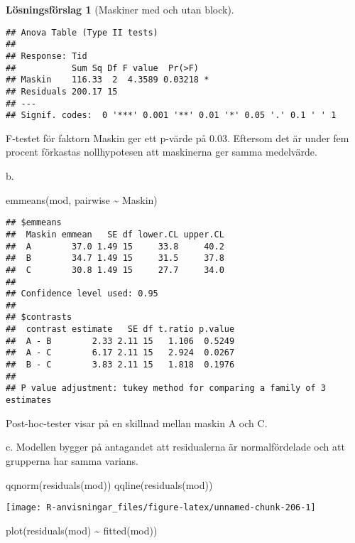 \documentclass[
]{book}
\newenvironment{Shaded}{\begin{snugshade}}{\end{snugshade}}
\newcommand{\FunctionTok}[1]{\textcolor[rgb]{0.00,0.00,0.00}{#1}}
\newcommand{\NormalTok}[1]{#1}
\newcommand{\SpecialCharTok}[1]{\textcolor[rgb]{0.00,0.00,0.00}{#1}}
\theoremstyle{definition}
\theoremstyle{definition}
\theoremstyle{definition}
\theoremstyle{definition}
\newtheorem{hypothesis}{Lösningsförslag}[chapter]
\theoremstyle{remark}
\begin{document}
\begin{hypothesis}[Maskiner med och utan block]
\begin{verbatim}
## Anova Table (Type II tests)
## 
## Response: Tid
##           Sum Sq Df F value  Pr(>F)  
## Maskin    116.33  2  4.3589 0.03218 *
## Residuals 200.17 15                  
## ---
## Signif. codes:  0 '***' 0.001 '**' 0.01 '*' 0.05 '.' 0.1 ' ' 1
\end{verbatim}

F-testet för faktorn Maskin ger ett p-värde på 0.03. Eftersom det är under fem procent förkastas nollhypotesen att maskinerna ger samma medelvärde.

b.

\begin{Shaded}
\begin{Highlighting}[]
\FunctionTok{emmeans}\NormalTok{(mod, pairwise }\SpecialCharTok{\textasciitilde{}}\NormalTok{ Maskin)}
\end{Highlighting}
\end{Shaded}

\begin{verbatim}
## $emmeans
##  Maskin emmean   SE df lower.CL upper.CL
##  A        37.0 1.49 15     33.8     40.2
##  B        34.7 1.49 15     31.5     37.8
##  C        30.8 1.49 15     27.7     34.0
## 
## Confidence level used: 0.95 
## 
## $contrasts
##  contrast estimate   SE df t.ratio p.value
##  A - B        2.33 2.11 15   1.106  0.5249
##  A - C        6.17 2.11 15   2.924  0.0267
##  B - C        3.83 2.11 15   1.818  0.1976
## 
## P value adjustment: tukey method for comparing a family of 3 estimates
\end{verbatim}

Post-hoc-tester visar på en skillnad mellan maskin A och C.

c. Modellen bygger på antagandet att residualerna är normalfördelade och att grupperna har samma varians.

\begin{Shaded}
\begin{Highlighting}[]
\FunctionTok{qqnorm}\NormalTok{(}\FunctionTok{residuals}\NormalTok{(mod))}
\FunctionTok{qqline}\NormalTok{(}\FunctionTok{residuals}\NormalTok{(mod))}
\end{Highlighting}
\end{Shaded}

\begin{center}\texttt{[image: R-anvisningar\_files/figure-latex/unnamed-chunk-206-1]} \end{center}

\begin{Shaded}
\begin{Highlighting}[]
\FunctionTok{plot}\NormalTok{(}\FunctionTok{residuals}\NormalTok{(mod) }\SpecialCharTok{\textasciitilde{}} \FunctionTok{fitted}\NormalTok{(mod))}
\end{Highlighting}
\end{Shaded}


\end{hypothesis}
\end{document}
